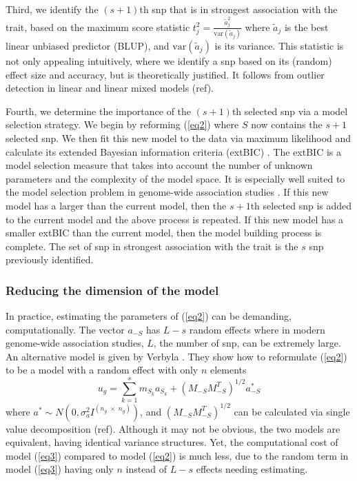 \documentclass{nature}
\begin{document}
Third, we identify the $(s+1)$th snp that is in strongest association with the trait, based on the maximum score statistic
$t_j^2 = \frac{ \widetilde{a} _j^2}{\textrm{var}(\widetilde{a}_j)}$ where $\widetilde{a}_j$ is the best linear unbiased predictor (BLUP), 
and $\textrm{var}(\widetilde{a}_j)$ is its variance. This statistic is not only appealing intuitively, where we 
identify a snp based on its (random) effect size and accuracy, but is theoretically justified.  It follows from outlier detection 
in linear and linear mixed models (ref). 

Fourth, we determine the importance of the $(s+1)$th selected snp via a model selection strategy. 
We begin by reforming (\ref{eq2}) where $S$ now contains the $s + 1$ selected snp.  We then fit this new model to the data
via maximum likelihood and calculate its extended Bayesian information criteria (extBIC) \cite{chen2008extended}.  The 
extBIC is a model selection measure that takes into account the number of unknown parameters and the complexity 
of the model space.  It is especially well suited to the model selection problem in genome-wide association studies \cite{chen2008extended}. If this new model has a larger  than the current model, then the $s+1$th selected snp is added to 
the current model and the above process is repeated. If this new model has a smaller extBIC than the current model, then the 
model building process is complete. The set of snp in strongest association with the trait is the $s$ snp previously identified. 

\subsubsection{Reducing the dimension of the model}
In practice, estimating the parameters of (\ref{eq2}) can be demanding, computationally. 
The vector $a_{-S}$ has $L-s$ random effects where in modern genome-wide association studies, 
$L$, the number of snp, can be extremely large.  An alternative model is given by 
Verbyla \cite{verbyla2012rwgaim,verbyla2014whole}. 
They show how to reformulate (\ref{eq2}) to be a model with a random effect with only $n$ elements
\begin{equation}
\label{eq3}
u_g = \sum_{k=1}^s  m_{S_k} a_{S_k} + (M_{-S} M_{-S}^T)^{1/2} a^*_{-S}
\end{equation}
where $a^* \sim N(0, \sigma_a^2 I^{(n_g \; \times \;  n_g)})$, and 
$(M_{-S} M_{-S}^T)^{1/2}$ can be calculated via single value decomposition (ref).  
Although it may not be obvious, the two models are equivalent, 
having identical variance structures. Yet, the computational cost of model (\ref{eq3}) compared to 
model (\ref{eq2}) is much less, due to the random term in model (\ref{eq3}) having only $n$ instead of $L-s$ 
effects needing estimating. 
\end{document}
